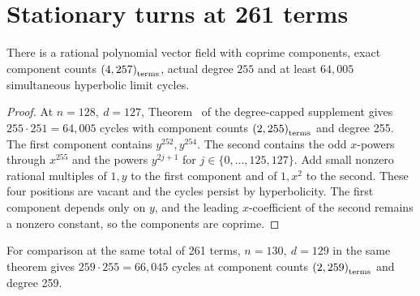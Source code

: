 \clearpage
\section{Stationary turns at 261 terms}\label{sec:tree-stationary}
\begin{corollary}\label{cor:64005}
There is a rational polynomial vector field with coprime components, exact component counts \(\left(4,257\right)_{\mathrm{terms}}\), actual degree \(255\) and at least \(64{,}005\) simultaneous hyperbolic limit cycles.
\end{corollary}
\begin{proof}
At \(n=128,\ d=127\), Theorem~ of the degree-capped supplement gives \(255\cdot251=64{,}005\) cycles with component counts \(\left(2,255\right)_{\mathrm{terms}}\) and degree 255. The first component contains \(y^{252},y^{254}\). The second contains the odd \(x\)-powers through \(x^{255}\) and the powers \(y^{2j+1}\) for \(j\in\{0,\ldots,125,127\}\). Add small nonzero rational multiples of \(1,y\) to the first component and of \(1,x^2\) to the second. These four positions are vacant and the cycles persist by hyperbolicity. The first component depends only on \(y\), and the leading \(x\)-coefficient of the second remains a nonzero constant, so the components are coprime.
\end{proof}
For comparison at the same total of 261 terms, \(n=130,\ d=129\) in the same theorem gives \(259\cdot255=66{,}045\) cycles at component counts \(\left(2,259\right)_{\mathrm{terms}}\) and degree 259.
